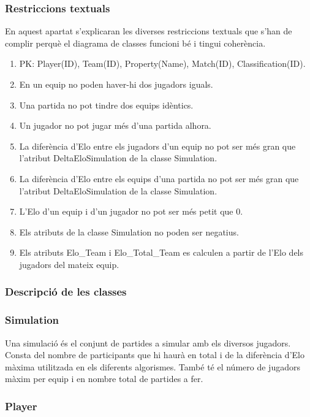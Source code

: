 \documentclass[a4paper]{article}
\begin{document}
\subsubsection{Restriccions textuals}
En aquest apartat s'explicaran les diverses restriccions textuals que s'han de complir perquè el diagrama de classes funcioni bé i tingui coherència.
\begin{enumerate}
    \item PK: Player(ID), Team(ID), Property(Name), Match(ID), Classification(ID).
    \item En un equip no poden haver-hi dos jugadors iguals.
    \item Una partida no pot tindre dos equips idèntics.
    \item Un jugador no pot jugar més d'una partida alhora.
    \item La diferència d'Elo entre els jugadors d'un equip no pot ser més gran que l'atribut DeltaEloSimulation  de la classe Simulation.
    \item La diferència d'Elo entre els equips d'una partida no pot ser més gran que l'atribut DeltaEloSimulation  de la classe Simulation.
    \item L'Elo d'un equip i d'un jugador no pot ser més petit que 0.
    \item Els atributs de la classe Simulation no poden ser negatius.
    \item Els atributs Elo\_Team i Elo\_Total\_Team es calculen a partir de l'Elo dels jugadors del mateix equip.
\end{enumerate}

\subsubsection{Descripció de les classes}

\subsubsection*{Simulation}

Una simulació és el conjunt de partides a simular amb els diversos jugadors. Consta del nombre de participants que hi haurà en total i de la diferència d'Elo màxima utilitzada en els diferents algorismes. També té el número de jugadors màxim per equip i en nombre total de partides a fer.

\subsubsection*{Player}
\end{document}
